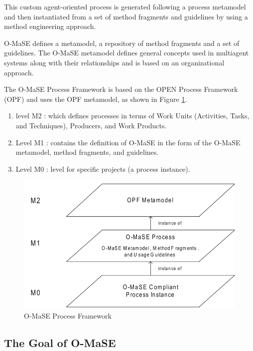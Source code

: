 This custom agent-oriented process is generated following a process metamodel 
and then instantiated from a set of method fragments and guidelines 
by using a method engineering approach. 

O-MaSE defines a metamodel, a repository of method fragments and a set of guidelines. 
The O-MaSE metamodel defines general concepts used in multiagent systems
along with their relationships and is based on an organizational approach\cite{omacs6}.
 
The O-MaSE Process Framework is based on the OPEN Process Framework (OPF)
and uses the OPF metamodel, as shown in Figure \ref{fig:O-MaSE Process Framework}\cite{omacs4}.

\begin{enumerate}
\item 
	level M2 : which defines processes in terms of Work Units (Activities, Tasks, and Techniques),
	 Producers, and Work Products.
\item
	Level M1 : contains the definition of O-MaSE in the form of the O-MaSE metamodel, method fragments, and guidelines. 
\item
	Level M0 : level for specific projects (a process instance).
\end{enumerate} 

\begin{figure}[th]
	\centering %
		\includegraphics[scale=0.4]{ch1/img/omase}
	\caption{\label{fig:O-MaSE Process Framework}O-MaSE Process Framework \cite{omacs4}}
\end{figure}
\subsection{The Goal of O-MaSE}


